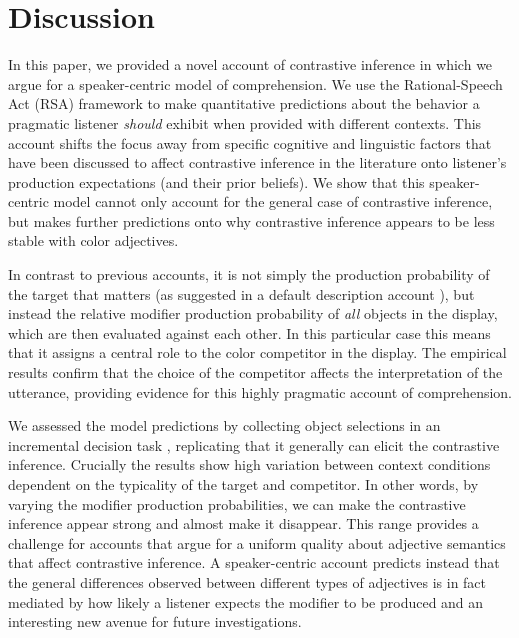 \documentclass[10pt,letterpaper]{article}
\begin{document}
\section{Discussion}

In this paper, we provided a novel account of contrastive inference in which we argue for a speaker-centric model of comprehension. We use the Rational-Speech Act (RSA) framework to make quantitative predictions about the behavior a pragmatic listener \textit{should} exhibit when provided with different contexts. This account shifts the focus away from specific cognitive and linguistic factors that have been discussed to affect contrastive inference in the literature onto listener's production expectations (and their prior beliefs). We show that this speaker-centric model cannot only account for the general case of contrastive inference, but makes further predictions onto why contrastive inference appears to be less stable with color adjectives. 

In contrast to previous accounts, it is not simply the production probability of the target that matters (as suggested in a default description account \cite{Sedivy:2003}), but instead the relative modifier production probability of \emph{all} objects in the display, which are then evaluated against each other. In this particular case this means that it assigns a central role to the color competitor in the display. The empirical results confirm that the choice of the competitor affects the interpretation of the utterance, providing evidence for this highly pragmatic account of comprehension.

We assessed the model predictions by collecting object selections in an incremental decision task \cite{Qing:2018}, replicating that it generally can elicit the contrastive inference. Crucially the results show high variation between context conditions dependent on the typicality of the target and competitor. In other words, by varying the modifier production probabilities, we can make the contrastive inference appear strong and almost make it disappear. This range provides a challenge for accounts that argue for a uniform quality about adjective semantics that affect contrastive inference. A speaker-centric account predicts instead that the general differences observed between different types of adjectives is in fact mediated by how likely a listener expects the modifier to be produced and an interesting new avenue for future investigations.
\end{document}

